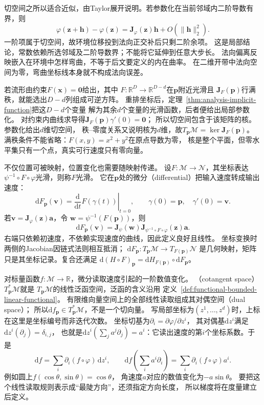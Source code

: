 切空间之所以适合近似，由Taylor展开说明。若参数化在当前邻域内二阶导数有界，则
\begin{equation}
 \varphi(\bm z+\bm h)-\varphi(\bm z)
 =\bm J_\varphi(\bm z)\bm h+O(\lVert\bm h\rVert_2^2).
 \label{eq:geometry-manifold-local-taylor}
\end{equation}
一阶项属于切空间，故环境位移投到法向正交补后只剩二阶余项。
这是局部结论，常数依赖所选邻域及二阶导数界；不能将它延伸到任意大步长。
法向偏离反映嵌入在环境中怎样弯曲，不等于后文要定义的内在曲率。
在二维开带中法向空间为零，弯曲坐标线本身就不构成法向误差。

若流形由约束$F(\bm x)=\bm0$给出，其中
$F:\mathbb R^D\to\mathbb R^{D-d}$在$\bm p$附近光滑且
$\bm J_F(\bm p)$行满秩，就能选出$D-d$列组成可逆方阵。
重排坐标后，定理~\ref{thm:analysis-implicit-function}把这$D-d$个变量
解为其余$d$个变量的光滑函数，后者便给出局部参数化。
对约束内曲线求导得$\bm J_F(\bm p)\gamma'(0)=\bm0$；
所以切空间包含于该矩阵的核。参数化给出$d$维切空间，
秩--零度关系又说明核为$d$维，故$T_{\bm p}\mathcal M=\ker\bm J_F(\bm p)$。
满秩条件不能省略：$F(x,y)=x^2+y^2$在原点导数为零，
核是整个平面，但零水平集只有一个点，真实可行速度只有零向量。

不仅位置可被映射，位置变化也需要随映射传递。
设$F:\mathcal M\to\mathcal N$，其坐标表达
$\psi^{-1}\circ F\circ\varphi$光滑，则称$F$光滑。
它在$\bm p$处的微分（differential）把输入速度转成输出速度：
\[
 \mathrm dF_{\bm p}(\bm v)
 =\left.\frac{\mathrm d}{\mathrm dt}F(\gamma(t))\right|_{t=0},
 \qquad\gamma(0)=\bm p,\quad\gamma'(0)=\bm v.
\]
若$\bm v=\bm J_\varphi(\bm z)\bm a$，令
$\bm w=\psi^{-1}(F(\bm p))$，则
\begin{equation}
 \mathrm dF_{\bm p}(\bm v)
 =\bm J_\psi(\bm w)
   \bm J_{\psi^{-1}\circ F\circ\varphi}(\bm z)\bm a.
 \label{eq:geometry-map-differential}
\end{equation}
右端只依赖初速度，不依赖实现速度的曲线，因此定义良好且线性。
坐标变换时两侧的Jacobian因链式法则相互抵消；
$\mathrm dF_{\bm p}:T_{\bm p}\mathcal M\to T_{F(\bm p)}\mathcal N$
是几何映射，矩阵只是其坐标记录。复合还满足
$\mathrm d(H\circ F)_{\bm p}=\mathrm dH_{F(\bm p)}\circ\mathrm dF_{\bm p}$。

对标量函数$f:\mathcal M\to\mathbb R$，微分读取速度引起的一阶数值变化。
（cotangent space）$T_{\bm p}^*\mathcal M$就是
$T_{\bm p}\mathcal M$的线性泛函空间，泛函的含义沿用
定义~\ref{def:functional-bounded-linear-functional}。
有限维向量空间上的全部线性读取组成其对偶空间（dual space）；
所以$\mathrm df_{\bm p}\in T_{\bm p}^*\mathcal M$，不是一个切向量。
写局部坐标为$(z^1,\ldots,z^d)$时，上标在这里是坐标编号而非迭代次数。
坐标切基为$\partial_i=\partial\varphi/\partial z^i$，
其对偶基$\mathrm dz^i$满足$\mathrm dz^i(\partial_j)=\delta_{i,j}$，
也就是$\mathrm dz^i(\sum_j a^j\partial_j)=a^i$：它读出速度的第$i$个坐标系数。于是
\[
 \mathrm df=\sum_i\partial_i(f\circ\varphi)\,\mathrm dz^i,\qquad
 \mathrm df\!\left(\sum_i a^i\partial_i\right)
 =\sum_i\partial_i(f\circ\varphi)a^i.
\]
例如圆上$f(\cos\theta,\sin\theta)=\cos\theta$，
角速度$a$对应的数值变化为$-a\sin\theta$。
要把这个线性读取规则表示成“最陡方向”，还须指定方向长度，
所以梯度将在度量建立后定义。

